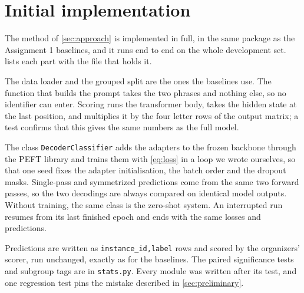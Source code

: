 \section{Initial implementation}
\label{sec:implementation}

The method of \cref{sec:approach} is implemented in full, in the same package as the Assignment 1 baselines, and it runs end to end on the whole development set.  lists each part with the file that holds it.

The data loader and the grouped split are the ones the baselines use. The function that builds the prompt takes the two phrases and nothing else, so no identifier can enter. Scoring runs the transformer body, takes the hidden state at the last position, and multiplies it by the four letter rows of the output matrix; a test confirms that this gives the same numbers as the full model.

The class \texttt{DecoderClassifier} adds the adapters to the frozen backbone through the PEFT library and trains them with \cref{eq:loss} in a loop we wrote ourselves, so that one seed fixes the adapter initialisation, the batch order and the dropout masks. Single-pass and symmetrized predictions come from the same two forward passes, so the two decodings are always compared on identical model outputs. Without training, the same class is the zero-shot system. An interrupted run resumes from its last finished epoch and ends with the same losses and predictions.

Predictions are written as \texttt{instance\_id,label} rows and scored by the organizers' scorer, run unchanged, exactly as for the baselines. The paired significance tests and subgroup tags are in \texttt{stats.py}. Every module was written after its test, and one regression test pins the mistake described in \cref{sec:preliminary}.
